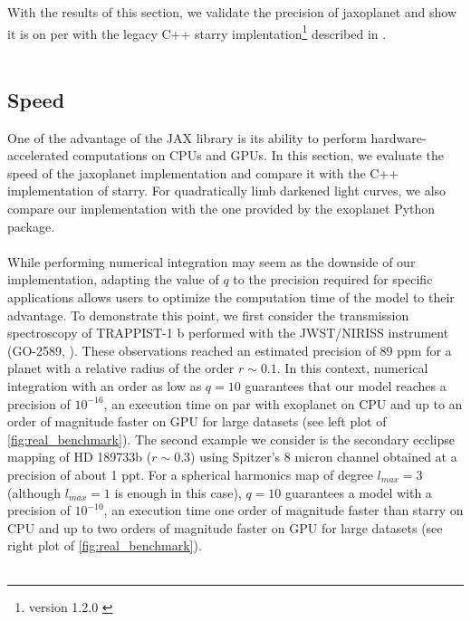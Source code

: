 \documentclass[modern]{aastex631}
\begin{document}
With the results of this section, we validate the precision of \textsf{jaxoplanet} and show it is on per with the legacy C++ \textsf{starry} implentation\footnote{version 1.2.0 \citep{starry_120}} described in \cite{starry}.\\\\

\subsection{Speed}\label{speed}

One of the advantage of the \textsf{JAX} library is its ability to perform hardware-accelerated computations on CPUs and GPUs. In this section, we evaluate the speed of the \textsf{jaxoplanet} implementation and compare it with the C++ implementation of \textsf{starry}. For quadratically limb darkened light curves, we also compare our implementation with the one provided by the \textsf{exoplanet} Python package.\\\\
While performing numerical integration may seem as the downside of our implementation, adapting the value of $q$ to the precision required for specific applications allows users to optimize the computation time of the model to their advantage. To demonstrate this point, we first consider the transmission spectroscopy of TRAPPIST-1 b performed with the JWST/NIRISS instrument (GO-2589, \citealt{Lim2023}). These observations reached an estimated precision of 89 ppm for a planet with a relative radius of the order $r\sim0.1$. In this context, numerical integration with an order as low as $q=10$ guarantees that our model reaches a precision of $10^{-16}$, an execution time on par with \textsf{exoplanet} on CPU and up to an order of magnitude faster on GPU for large datasets (see left plot of \autoref{fig:real_benchmark}). The second example we consider is the secondary ecclipse mapping of HD 189733b ($r\sim0.3$) using Spitzer's 8 micron channel \citep{majeau2012} obtained at a precision of about 1 ppt. For a spherical harmonics map of degree $l_{max}=3$ (although $l_{max}=1$ is enough in this case), $q=10$ guarantees a model with a precision of $10^{-10}$, an execution time one order of magnitude faster than \textsf{starry} on CPU and up to two orders of magnitude faster on GPU for large datasets (see right plot of \autoref{fig:real_benchmark}).\\\\
\end{document}
